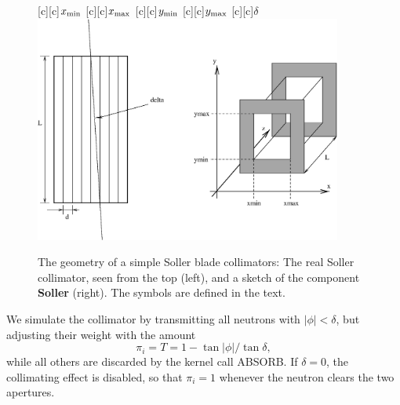 \begin{figure}
  \begin{center}
    [c][c]{$x_{\rm min}$}
    [c][c]{$x_{\rm max}$}
    [c][c]{$y_{\rm min}$}
    [c][c]{$y_{\rm max}$}
    [c][c]{$\delta$}
    \includegraphics[width=0.9\textwidth]{figures/collimator.eps}
  \end{center}
\caption{The geometry of a simple Soller blade collimators:
The real Soller collimator, seen from the top (left),
and a sketch of the component {\bf Soller} (right).
The symbols are defined in the text.}
\label{f:collimator}
\end{figure}

We simulate the collimator by transmitting all neutrons with
$|\phi| < \delta$, but adjusting their weight with the amount
\begin{equation}
\pi_i = T = 1-\tan|\phi|/ \tan\delta ,
\end{equation}
while all others are discarded by the kernel call ABSORB.
If $\delta=0$, the collimating effect is disabled,
so that $\pi_i = 1$ whenever the neutron clears the two apertures.
